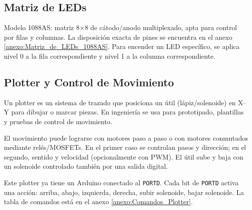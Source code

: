 \subsection{Matriz de LEDs}
Modelo 1088AS: matriz 8×8 de cátodo/anodo multiplexado, apta para control por filas y columnas. La disposición exacta de pines se encuentra en el anexo \ref{anexo:Matriz_de_LEDs_1088AS}. Para encender un LED específico, se aplica nivel 0 a la fila correspondiente y nivel 1 a la columna correspondiente.




\subsection{Plotter y Control de Movimiento}
Un plotter es un sistema de trazado que posiciona un útil (lápiz/solenoide) en X–Y para dibujar o marcar piezas. En ingeniería se usa para prototipado, plantillas y pruebas de control de movimiento.

El movimiento puede lograrse con motores paso a paso o con motores conmutados mediante relés/MOSFETs. En el primer caso se controlan pasos y dirección; en el segundo, sentido y velocidad (opcionalmente con PWM). El útil sube y baja con un solenoide controlado también por una salida digital.

Este plotter ya tiene un Arduino conectado al \texttt{PORTD}. Cada bit de \texttt{PORTD} activa una acción: arriba, abajo, izquierda, derecha, subir solenoide, bajar solenoide. La tabla de comandos está en el anexo \ref{anexo:Comandos_Plotter}.




